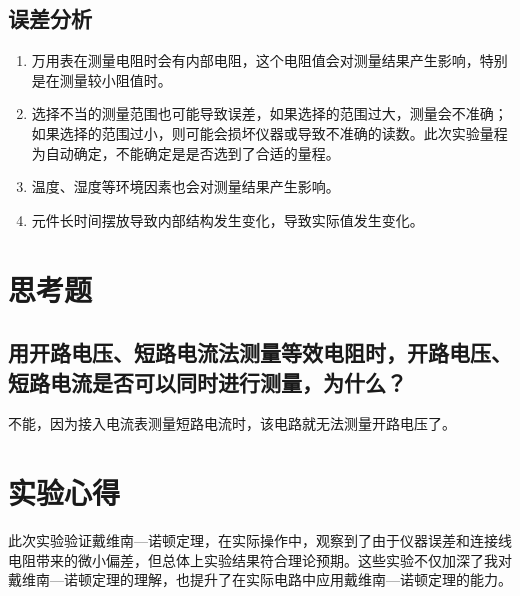 \documentclass[a4paper,utf8]{article}
\begin{document}
\subsection{误差分析}
    \begin{enumerate}
        \item 万用表在测量电阻时会有内部电阻，这个电阻值会对测量结果产生影响，特别是在测量较小阻值时。
        \item 选择不当的测量范围也可能导致误差，如果选择的范围过大，测量会不准确；如果选择的范围过小，则可能会损坏仪器或导致不准确的读数。此次实验量程为自动确定，不能确定是是否选到了合适的量程。
        \item 温度、湿度等环境因素也会对测量结果产生影响。
        \item 元件长时间摆放导致内部结构发生变化，导致实际值发生变化。
    \end{enumerate}
\section{思考题}
\subsection{用开路电压、短路电流法测量等效电阻时，开路电压、短路电流是否可以同时进行测量，为什么？}
不能，因为接入电流表测量短路电流时，该电路就无法测量开路电压了。
\section{实验心得}
此次实验验证戴维南—诺顿定理，在实际操作中，观察到了由于仪器误差和连接线电阻带来的微小偏差，但总体上实验结果符合理论预期。这些实验不仅加深了我对戴维南—诺顿定理的理解，也提升了在实际电路中应用戴维南—诺顿定理的能力。
\clearpage
\end{document}

